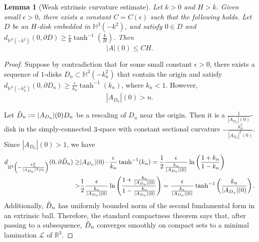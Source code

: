 \documentclass[12pt,a4paper]{amsart}
\numberwithin{equation}{section}
\theoremstyle{plain}
\newtheorem{Lemma}[Th]{Lemma}
\theoremstyle{named}
\theoremstyle{definition}
\begin{document}
\begin{Lemma}[Weak extrinsic curvature estimate]\label{lemma_weak extrinsic}
    Let $k>0$ and $H>k$. Given small $\epsilon>0$, there exists a constant $C=C(\epsilon)$ such that the following holds. Let $D$ be an $H$-disk embedded in $\mathbb{H}^3(-k^2)$, and satisfy $0\in D$ and $d_{\mathbb{H}^3(-k^2)}(0,\partial D)\geq\frac{\epsilon}{k}\tanh^{-1}\left(\frac{k}{H}\right)$. Then \begin{equation*}
        |A|(0)\leq CH.
    \end{equation*}
\end{Lemma}

\begin{proof}
    Suppose by contradiction that for some small constant $\epsilon>0$, there exists a sequence of $1$-disks $D_n\subset \mathbb{H}^3(-k_n^2)$ that contain the origin and satisfy $d_{\mathbb{H}^3(-k_n^2)}(0,\partial D_n)\geq\frac{\epsilon}{k_n}\tanh^{-1}(k_n)$, where $k_n<1$. However, \begin{equation}\label{equ_assump_extrinsic}
        |A_{D_n}|(0)>n.
    \end{equation}
    
    Let $\Tilde{D}_n:=|A_{D_n}|(0)D_n$ be a rescaling of $D_n$ near the origin. Then it is a $\frac{1}{|A_{D_n}|(0)}$-disk in the simply-connected $3$-space with constant sectional curvature $-\frac{k_n^2}{|A_{D_n}|^2(0)}$. Since $|A_{D_n}|(0)>1$, we have  
    \begin{align}\label{equ_dist_lower}
       d_{\mathbb{H}^3\left(-\frac{k_n^2}{|A_{D_n}|^2(0)}\right)}(0,\partial \Tilde{D}_n)\geq & |A_{D_n}|(0)\cdot \frac{\epsilon}{k_n}\tanh^{-1}(k_n)=\frac12 \frac{\epsilon}{\frac{k_n}{|A_{D_n}|(0)}}\ln\left(\frac{1+k_n}{1-k_n}\right)\\\nonumber
       >& \frac12 \frac{\epsilon}{\frac{k_n}{|A_{D_n}|(0)}}\ln\left(\frac{1+\frac{k_n}{|A_{D_n}|(0)}}{1-\frac{k_n}{|A_{D_n}|(0)}}\right)=\frac{\epsilon}{\frac{k_n}{|A_{D_n}|(0)}}\tanh^{-1}\left(\frac{k_n}{|A_{D_n}|(0)}\right).
    \end{align} 
    Additionally, $\Tilde{D}_n$ has uniformly bounded norm of the second fundamental form in an extrinsic ball. Therefore, the standard compactness theorem says that, after passing to a subsequence, $\Tilde{D}_n$ converges smoothly on compact sets to a minimal lamination $\mathcal{L}$ of $\mathbb{R}^3$. 
    

\end{proof}
\end{document}
